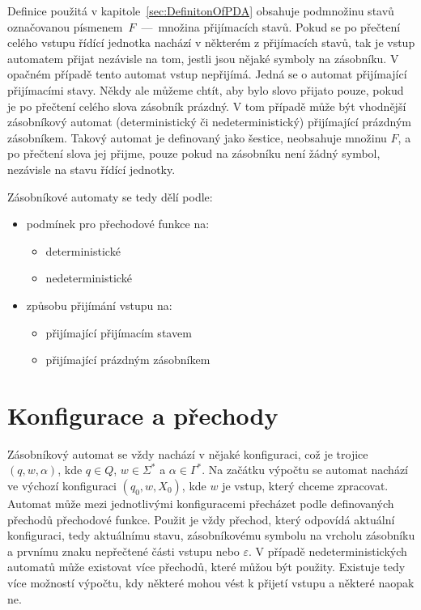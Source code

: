 Definice použitá v kapitole~\ref{sec:DefinitonOfPDA} obsahuje podmnožinu stavů označovanou písmenem~$F$~---~množina přijímacích stavů. Pokud se po přečtení celého vstupu řídící jednotka nachází v některém z přijímacích stavů, tak je vstup automatem přijat nezávisle na tom, jestli jsou nějaké symboly na zásobníku. V opačném případě tento automat vstup nepřijímá. Jedná se o automat přijímající přijímacími stavy. Někdy ale můžeme chtít, aby bylo slovo přijato pouze, pokud je po přečtení celého slova zásobník prázdný. V tom případě může být vhodnější zásobníkový automat (deterministický či nedeterministický) přijímající prázdným zásobníkem. Takový automat je definovaný jako šestice, neobsahuje množinu $F$, a po přečtení slova jej přijme, pouze pokud na zásobníku není žádný symbol, nezávisle na stavu řídící jednotky.

Zásobníkové automaty se tedy dělí podle:
\begin{itemize}
    \item podmínek pro přechodové funkce na:
        \begin{itemize}
            \item deterministické
            \item nedeterministické
        \end{itemize}
    \item způsobu přijímání vstupu na:
        \begin{itemize}
            \item přijímající přijímacím stavem
            \item přijímající prázdným zásobníkem
        \end{itemize}
\end{itemize}

\section{Konfigurace a přechody}

Zásobníkový automat se vždy nachází v nějaké konfiguraci, což je trojice $(q,w,\alpha)$, kde $q \in Q$, $w \in \Sigma^{*}$ a $\alpha \in \Gamma^{*}$. Na začátku výpočtu se automat nachází ve výchozí konfiguraci $(q_0, w, X_0)$, kde $w$ je vstup, který chceme zpracovat.~\cite{Kozen1997} Automat může mezi jednotlivými konfiguracemi přecházet podle definovaných přechodů přechodové funkce. Použit je vždy přechod, který odpovídá aktuální konfiguraci, tedy aktuálnímu stavu, zásobníkovému symbolu na vrcholu zásobníku a prvnímu znaku nepřečtené části vstupu nebo $\varepsilon$. V případě nedeterministických automatů může existovat více přechodů, které můžou být použity. Existuje tedy více možností výpočtu, kdy některé mohou vést k přijetí vstupu a některé naopak ne.

